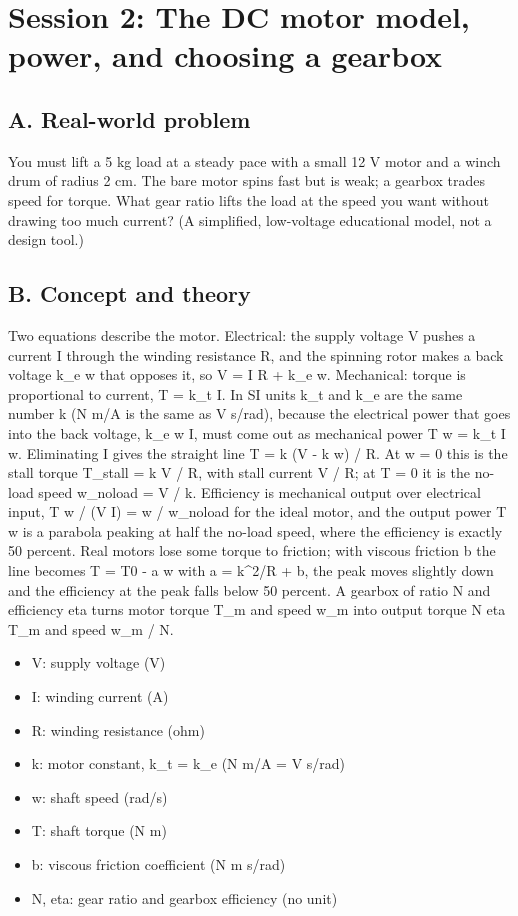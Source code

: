 \documentclass[11pt,a4paper]{article}
\begin{document}
\section{Session 2: The DC motor model, power, and choosing a gearbox}

\subsection*{A. Real-world problem}
You must lift a 5 kg load at a steady pace with a small 12 V motor and a winch drum of radius 2 cm. The bare motor spins fast but is weak; a gearbox trades speed for torque. What gear ratio lifts the load at the speed you want without drawing too much current? (A simplified, low-voltage educational model, not a design tool.)

\subsection*{B. Concept and theory}
Two equations describe the motor. Electrical: the supply voltage V pushes a current I through the winding resistance R, and the spinning rotor makes a back voltage k\_e w that opposes it, so V = I R + k\_e w. Mechanical: torque is proportional to current, T = k\_t I. In SI units k\_t and k\_e are the same number k (N m/A is the same as V s/rad), because the electrical power that goes into the back voltage, k\_e w I, must come out as mechanical power T w = k\_t I w. Eliminating I gives the straight line T = k (V - k w) / R. At w = 0 this is the stall torque T\_stall = k V / R, with stall current V / R; at T = 0 it is the no-load speed w\_noload = V / k. Efficiency is mechanical output over electrical input, T w / (V I) = w / w\_noload for the ideal motor, and the output power T w is a parabola peaking at half the no-load speed, where the efficiency is exactly 50 percent. Real motors lose some torque to friction; with viscous friction b the line becomes T = T0 - a w with a = k\textasciicircum{}2/R + b, the peak moves slightly down and the efficiency at the peak falls below 50 percent. A gearbox of ratio N and efficiency eta turns motor torque T\_m and speed w\_m into output torque N eta T\_m and speed w\_m / N.

\begin{itemize}[nosep]
\item V: supply voltage (V)
\item I: winding current (A)
\item R: winding resistance (ohm)
\item k: motor constant, k\_t = k\_e (N m/A = V s/rad)
\item w: shaft speed (rad/s)
\item T: shaft torque (N m)
\item b: viscous friction coefficient (N m s/rad)
\item N, eta: gear ratio and gearbox efficiency (no unit)
\end{itemize}
\end{document}
